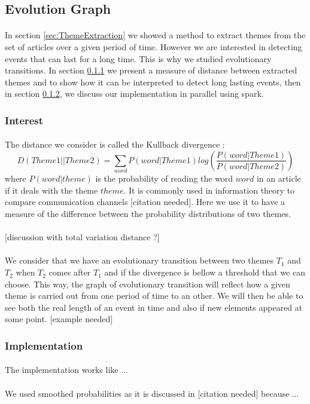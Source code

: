 \subsection{Evolution Graph}
\paragraph{}
In section \ref{sec:ThemeExtraction} we showed a method to extract themes from the set of articles over a given period of time. However we are interested in detecting events that can last for a long time. This is why we studied evolutionary transitions. In section \ref{sec:EvoGraInt} we present a measure of distance between extracted themes and to show how it can be interpreted to detect long lasting events, then in section \ref{sec:EvoGraImp}, we discuss our implementation in parallel using spark.

\subsubsection{Interest}
\label{sec:EvoGraInt}

\paragraph{}
The distance we consider is called the Kullback divergence :\[ D(Theme1 || Theme2) = \sum_{word} P(word|Theme1) log(\frac{P(word|Theme1)}{P(word|Theme2)})\]where $P(word|theme)$ is the probability of reading the word $word$ in an article if it deals with the theme $theme$. It is commonly used in information theory to compare communication channels [citation needed]. Here we use it to have a measure of the difference between the probability distributions of two themes. 

\paragraph{}
[discussion with total variation distance ?]

\paragraph{}
We consider that we have an evolutionary transition between two themes $T_1$ and $T_2$ when $T_2$ comes after $T_1$ and if the divergence is bellow a threshold that we can choose. This way, the graph of evolutionary transition will reflect how a given theme is carried out from one period of time to an other. We will then be able to see both the real length of an event in time and also if new elements appeared at some point. [example needed]

\subsubsection{Implementation}
\label{sec:EvoGraImp}
\paragraph{}
The implementation works like ...

\paragraph{}
We used smoothed probabilities as it is discussed in [citation needed] because ... 


